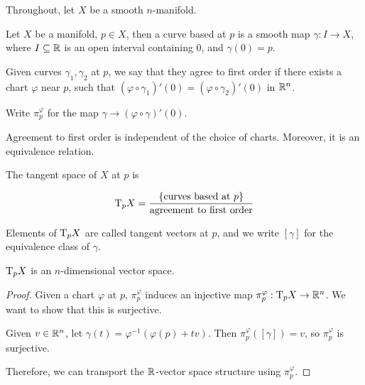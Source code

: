 Throughout, let \(X\) be a smooth \(n\)-manifold.

\begin{definition}

    Let \(X\) be a manifold, \(p \in X\), then a curve based at \(p\) is a smooth map \(\gamma : I \to X\), where \(I \subseteq \mathbb{R}\) is an open interval containing \(0\), and \(\gamma(0) = p\).
\end{definition}

\begin{definition}
     Given curves \(\gamma_1, \gamma_2\) at \(p\), we say that they agree to first order if there exists a chart \(\varphi\) near \(p\), such that \((\varphi \circ \gamma_1)'(0) = (\varphi \circ \gamma_2)'(0)\) in \(\mathbb{R}^n\).

    Write \(\pi_p^\varphi\) for the map \(\gamma \to (\varphi \circ \gamma)'(0)\).
\end{definition}

\begin{lemma}
    Agreement to first order is independent of the choice of charts. Moreover, it is an equivalence relation.
\end{lemma}

\begin{definition}
     The tangent space of \(X\) at \(p\) is

    \[\mathrm{T}_pX = \frac{\left\{\text{curves based at }p\right\}}{\text{agreement to first order}}\]

    Elements of \(\mathrm{T}_pX\) are called tangent vectors at \(p\), and we write \([\gamma]\) for the equivalence class of \(\gamma\).
\end{definition}

\begin{proposition}
    \(\mathrm{T}_pX\) is an \(n\)-dimensional vector space.
\end{proposition}

\begin{proof}
    Given a chart \(\varphi\) at \(p\), \(\pi_p^\varphi\) induces an injective map \(\pi_p^\varphi : \mathrm{T}_pX \to \mathbb{R}^n\). We want to show that this is surjective.

    Given \(v \in \mathbb{R}^n\), let \(\gamma(t) = \varphi^{-1}(\varphi(p) + tv)\). Then \(\pi_p^\varphi([\gamma]) = v\), so \(\pi_p^\varphi\) is surjective.

    Therefore, we can transport the \(\mathbb{R}\)-vector space structure using \(\pi_p^\varphi\).
\end{proof}

